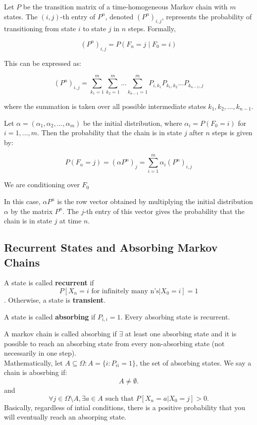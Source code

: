 \documentclass[a4paper]{article}
\begin{document}
\begin{definition}
  Let $P$ be the transition matrix of a time-homogeneous Markov chain with $m$ states. The $(i,j)$-th entry of $P^n$, denoted $(P^n)_{i,j}$, represents the probability of transitioning from state $i$ to state $j$ in $n$ steps. Formally,

\[
(P^n)_{i,j} = P(F_n = j \mid F_0 = i)
\]

This can be expressed as:

\[
(P^n)_{i,j} = \sum_{k_1=1}^{m} \sum_{k_2=1}^{m} \dots \sum_{k_{n-1}=1}^{m} P_{i,k_1} P_{k_1,k_2} \dots P_{k_{n-1},j}
\]

where the summation is taken over all possible intermediate states $k_1, k_2, \dots, k_{n-1}$.
\end{definition}
\begin{lemma}
  
Let $\alpha = (\alpha_1, \alpha_2, \dots, \alpha_m)$ be the initial distribution, where $\alpha_i = P(F_0 = i)$ for $i = 1, \dots, m$. Then the probability that the chain is in state $j$ after $n$ steps is given by:

\[
P(F_n = j) = (\alpha P^n)_j = \sum_{i=1}^{m} \alpha_i (P^n)_{i,j}
\]
\begin{note}
  We are conditioning over $F_0$
\end{note}

In this case, $\alpha P^n$ is the row vector obtained by multiplying the initial distribution $\alpha$ by the matrix $P^n$. The $j$-th entry of this vector gives the probability that the chain is in state $j$ at time $n$.
\end{lemma}

\subsection{Recurrent States and Absorbing Markov Chains}

\begin{definition}
  A state is  called \textbf{recurrent} if $$P[X_n= i \text{ for infinitely many n's} | X_0 = i] = 1$$. Otherwise, a state is \textbf{transient}.  
\end{definition}
\begin{definition}
  A state is called \textbf{absorbing} if $P_{i,i} = 1$. Every absorbing state is recurrent.
\end{definition}
\begin{definition}
  A markov chain is called absorbing if $\exists $ at least one absorbing state and it is possible to reach an absorbing state from every non-absorbing state (not necessarily in one step). \\

  Mathematically, let $A \subseteq \Omega: A = \{i : P_{ii}=1\} $, the set of absorbing states. We say a chain is abosrbing if:
  \[
  A \neq \emptyset
  .\] 
  and 
  \[
    \forall j \in \Omega \setminus A, \exists a \in A \text{ such that } P[X_n = a | X_0 = j] > 0
  .\] 
  Basically, regardless of intial conditions, there is a positive probability that you will eventually reach an absorping state.  
\end{definition}
\end{document}
